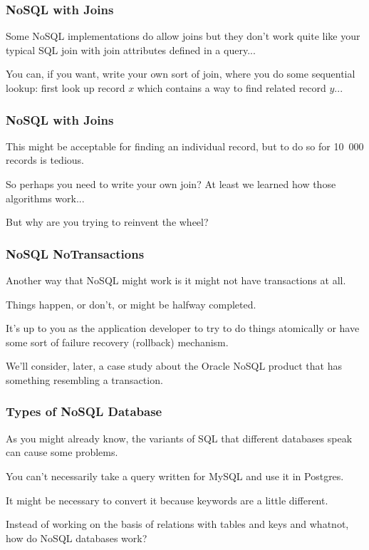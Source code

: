 \begin{frame}
\frametitle{NoSQL with Joins}

Some NoSQL implementations do allow joins but they don't work quite like your typical SQL join with join attributes defined in a query... 

You can, if you want, write your own sort of join, where you do some sequential lookup: first look up record $x$ which contains a way to find related record $y$...


\end{frame}



\begin{frame}
\frametitle{NoSQL with Joins}

 This might be acceptable for finding an individual record, but to do so for 10~000 records is tedious. 
 
 So perhaps you need to write your own join? At least we learned how those algorithms work... 

But why are you trying to reinvent the wheel?

\end{frame}



\begin{frame}
\frametitle{NoSQL NoTransactions}

Another way that NoSQL might work is it might not have transactions at all. 

Things happen, or don't, or might be halfway completed. 

It's up to you as the application developer to try to do things atomically or have some sort of failure recovery (rollback) mechanism. 

We'll consider, later, a case study about the Oracle NoSQL product that has something resembling a transaction.


\end{frame}



\begin{frame}
\frametitle{Types of NoSQL Database}

As you might already know, the variants of SQL that different databases speak can cause some problems.

You can't necessarily take a query written for MySQL and use it in Postgres.

It might be necessary to convert it because keywords are a little different.

Instead of working on the basis of relations with tables and keys and whatnot, how do NoSQL databases work?


\end{frame}


